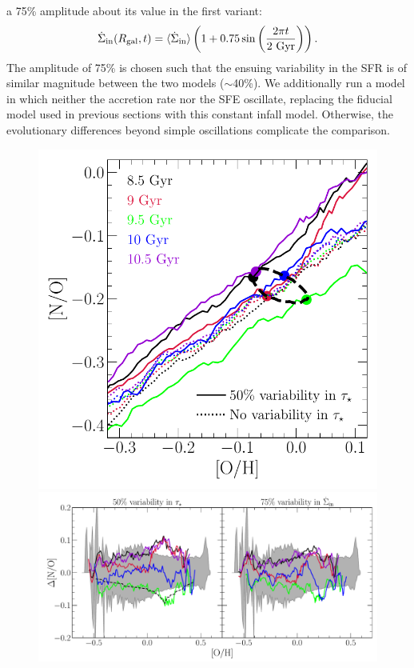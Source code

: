 \documentclass[ms.tex]{subfiles}
\begin{document}
a 75\% amplitude about its value in the first variant:
\begin{equation}
\dot{\Sigma}_\text{in}(R_\text{gal}, t) = \langle\dot{\Sigma}_\text{in}\rangle
\left(1 + 0.75\sin\left(\frac{2\pi t}{2~\text{Gyr}}\right)\right).
\label{eq:ifr_var}
\end{equation}
The amplitude of 75\% is chosen such that the ensuing variability in the SFR is
of similar magnitude between the two models ($\sim$40\%).
We additionally run a model in which neither the accretion rate nor the SFE
oscillate, replacing the fiducial model used in previous sections with this
constant infall model.
Otherwise, the evolutionary differences beyond simple oscillations complicate
the comparison.

\begin{figure}
\centering
\includegraphics[scale = 0.44]{no_oh_sfevar.pdf}
\includegraphics[scale = 0.47]{delta_no_schaefercomp.pdf}

\end{figure}
\end{document}
